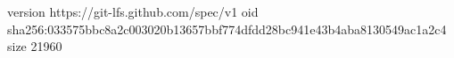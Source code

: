 version https://git-lfs.github.com/spec/v1
oid sha256:033575bbc8a2c003020b13657bbf774dfdd28bc941e43b4aba8130549ac1a2c4
size 21960

